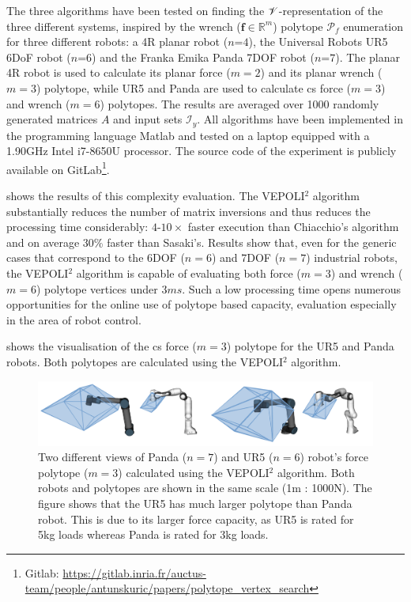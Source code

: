 The three algorithms have been tested on finding the $\mathscr{V}$-representation of the three different systems, inspired by the wrench ($\bm{f}\in\mathbb{R}^m$) polytope $\mathcal{P}_f$ enumeration for three different robots: a 4R planar robot ($n$=$4$), the {Universal Robots} UR5 6DoF robot ($n$=$6$) and the {Franka Emika Panda} 7DOF robot ($n$=$7$). The planar 4R robot is used to calculate its planar force ($m=2$) and its planar wrench ($m=3$) polytope, while UR5 and Panda are used to calculate \gls{cs} force ($m=3$) and wrench ($m=6$) polytopes. The results are averaged over 1000 randomly generated matrices $A$ and input sets $\mathcal{I}_y$. All algorithms have been implemented in the programming language Matlab and tested on a laptop equipped with a 1.90GHz Intel i7-8650U processor. The source code of the experiment is publicly available on GitLab\footnote{Gitlab: \url{https://gitlab.inria.fr/auctus-team/people/antunskuric/papers/polytope_vertex_search}}.

 shows the results of this complexity evaluation. The VEPOLI$^2$ algorithm substantially reduces the number of matrix inversions and thus reduces the processing time considerably: $4$-$10\times$ faster execution than Chiacchio's algorithm and on average 30\% faster than Sasaki's. Results show that, even for the generic cases that correspond to the 6DOF ($n=6$) and 7DOF ($n=7$) industrial robots, the VEPOLI$^2$ algorithm is capable of evaluating both force ($m=3$) and wrench ($m=6$) polytope vertices under $3ms$. Such a low processing time opens numerous opportunities for the online use of polytope based capacity, evaluation especially in the area of robot control. 

 shows the visualisation of the \gls{cs} force ($m=3$) polytope for the UR5 and Panda robots. Both polytopes are calculated using the VEPOLI$^2$ algorithm.

\begin{figure}
    \centering
    \includegraphics[width=\linewidth]{Papers/images/panda_ur5.png}
    \caption{Two different views of Panda ($n=7$) and UR5 ($n=6$) robot's force polytope ($m=3$) calculated using the VEPOLI$^2$ algorithm. Both robots and polytopes are shown in the same scale (1m : 1000N). The figure shows that the UR5 has much larger polytope than Panda robot. This is due to its larger force capacity, as UR5 is rated for 5kg loads whereas Panda is rated for 3kg loads.}
    \label{fig:panda_ur5_force}
\end{figure}


